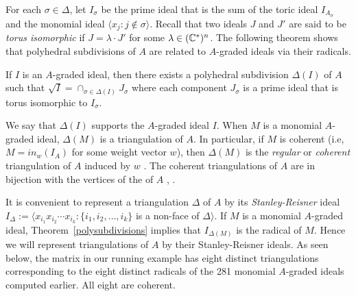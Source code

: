 For each $\sigma \in \Delta$, let $I_{\sigma}$ be the prime ideal 
that is the sum of the toric ideal $I_{A_{\sigma}}$ and the monomial 
ideal $\langle x_j :j \not \in \sigma \rangle$. Recall that two
ideals $J$ and $J'$ are said to be 
{\em torus isomorphic} if $J = \lambda \cdot J'$ for some $\lambda \in 
(\mathbb{C}^{\ast})^n$. The following theorem shows that polyhedral
subdivisions of $A$ are related to $A$-graded ideals via their 
radicals.

\begin{theorem}\label{polysubdivisions}
  If $I$ is an $A$-graded ideal, then there exists a polyhedral
  subdivision $\Delta(I)$ of $A$ such that $\sqrt{I} = \cap_{\sigma
    \in \Delta(I)} J_{\sigma}$ where each component $J_{\sigma}$ is a
  prime ideal that is torus isomorphic to $I_{\sigma}$.
\end{theorem}

We say that $\Delta(I)$ supports the $A$-graded ideal $I$.
When $M$ is a monomial $A$-graded ideal, $\Delta(M)$ is a 
triangulation of $A$. In particular, if $M$ is coherent (i.e, $M =
in_w(I_A)$ for some weight vector $w$), then $\Delta(M)$ is the {\em
  regular} or {\em coherent} triangulation of $A$ induced by $w$
\cite[\S 8]{HS:St2}. The coherent triangulations of $A$ are in bijection
with the vertices of the {\em {}} of $A$ \cite{HS:BFS},
\cite{HS:GKZ}.  

It is convenient to represent a triangulation $\Delta$ of $A$ by its 
{\em Stanley-Reisner} ideal $I_{\Delta} := \langle x_{i_1}x_{i_2}
\cdots x_{i_k} : \{ i_1, i_2, \ldots, i_k \}$ is a non-face of  
$\Delta \rangle$. If $M$ is a monomial $A$-graded ideal,
Theorem~\ref{polysubdivisions} implies that $I_{\Delta(M)}$ is the 
radical of $M$. Hence we will represent triangulations 
of $A$ by their Stanley-Reisner ideals. As seen below, the matrix in
our running example has eight distinct triangulations 
corresponding to the eight distinct radicals of the 281 monomial 
$A$-graded ideals computed earlier. All eight are coherent.

\medskip

